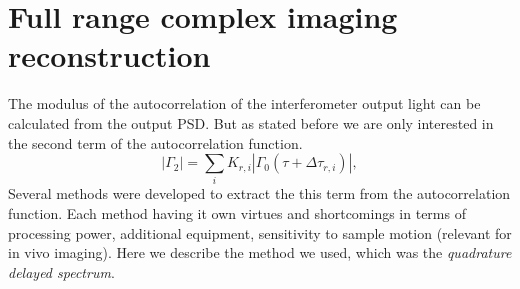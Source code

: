 \documentclass[12pt,twoside,english]{book}
\renewcommand{\~}{\perispomeni}%
\numberwithin{equation}{section}
\numberwithin{figure}{section}
\begin{document}
\section{Full range complex imaging reconstruction}
\label{section:quadrature}
The modulus of the autocorrelation of the interferometer output light can be calculated from the output \gls{PSD}. But as stated before we are only interested in the second term of the autocorrelation function.
\begin{equation} \left|\Gamma_{2}\right|=\sum_{i}K_{r,i}\left|\Gamma_{0}\left(\tau+\Delta\tau_{r,i}\right)\right|,\end{equation}
Several methods were developed to extract the this term from the autocorrelation function. Each method having it own virtues and shortcomings in terms of processing power, additional equipment, sensitivity to sample motion (relevant for in vivo imaging). Here we describe the method we used, which was the \emph{quadrature delayed spectrum}.
\end{document}

